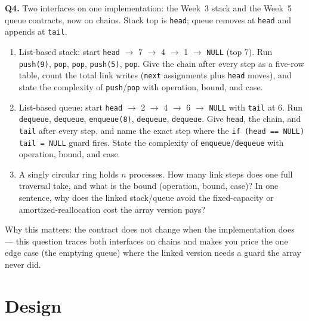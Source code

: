 \documentclass[11pt]{article}
\begin{document}
\textbf{Q4.} Two interfaces on one implementation: the Week~3 stack and the Week~5 queue contracts, now on chains. Stack top is \texttt{head}; queue removes at \texttt{head} and appends at \texttt{tail}.
\begin{enumerate}
  \item[(a)] List-based stack: start \texttt{head} $\to$ 7 $\to$ 4 $\to$ 1 $\to$ \texttt{NULL} (top 7). Run \texttt{push(9)}, \texttt{pop}, \texttt{pop}, \texttt{push(5)}, \texttt{pop}. Give the chain after every step as a five-row table, count the total link writes (\texttt{next} assignments plus \texttt{head} moves), and state the complexity of \texttt{push}/\texttt{pop} with operation, bound, and case.
  \item[(b)] List-based queue: start \texttt{head} $\to$ 2 $\to$ 4 $\to$ 6 $\to$ \texttt{NULL} with \texttt{tail} at 6. Run \texttt{dequeue}, \texttt{dequeue}, \texttt{enqueue(8)}, \texttt{dequeue}, \texttt{dequeue}. Give \texttt{head}, the chain, and \texttt{tail} after every step, and name the exact step where the \texttt{if (head == NULL) tail = NULL} guard fires. State the complexity of \texttt{enqueue}/\texttt{dequeue} with operation, bound, and case.
  \item[(c)] A singly circular ring holds $n$ processes. How many link steps does one full traversal take, and what is the bound (operation, bound, case)? In one sentence, why does the linked stack/queue avoid the fixed-capacity or amortized-reallocation cost the array version pays?
\end{enumerate}
Why this matters: the contract does not change when the implementation does --- this question traces both interfaces on chains and makes you price the one edge case (the emptying queue) where the linked version needs a guard the array never did.

\section{Design}
\end{document}
